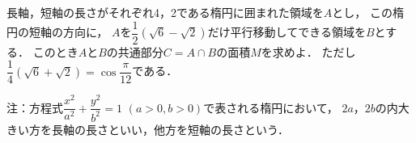 \documentclass[../../main.tex]{subfiles}
\begin{document}
長軸，短軸の長さがそれぞれ4，2である楕円に囲まれた領域を$A$とし，
この楕円の短軸の方向に，
$A$を$\displaystyle\dfrac{1}{2}(\sqrt6-\sqrt2)$だけ平行移動してできる領域を$B$とする．
このとき$A$と$B$の共通部分$C=A \cap B$の面積$M$を求めよ．
ただし$\displaystyle\dfrac{1}{4}(\sqrt6+\sqrt2)=\cos\dfrac{\pi}{12}$である．

注：方程式$\displaystyle\dfrac{x^2}{a^2}+\dfrac{y^2}{b^2}=1$ $(a>0,b>0)$で表される楕円において，
$2a$，$2b$の内大きい方を長軸の長さといい，他方を短軸の長さという．
\end{document}
